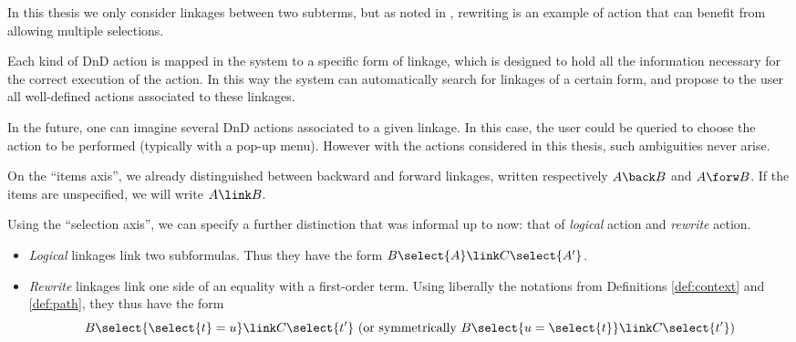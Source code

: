 \begin{remark}
In this thesis we only consider linkages between two subterms, but as noted in
, rewriting is an example of action that can benefit from
allowing multiple selections.
\end{remark}

Each kind of DnD action is mapped in the system to a specific form of linkage,
which is designed to hold all the information necessary for the correct
execution of the action. In this way the system can automatically search for
linkages of a certain form, and propose to the user all well-defined actions
associated to these linkages.

\begin{remark}
  In the future, one can imagine several DnD actions associated to a given
  linkage. In this case, the user could be queried to choose the action to be
  performed (typically with a pop-up menu). However with the actions considered
  in this thesis, such ambiguities never arise.
\end{remark}

On the ``items axis'', we already distinguished between backward and forward
linkages, written respectively $A \back B$ and $A \forw B$. If the items are
unspecified, we will write $A \link B$.

Using the ``selection axis'', we can specify a further distinction that was
informal up to now: that of \emph{logical} action and \emph{rewrite} action.
\begin{itemize}
  \item \emph{Logical} linkages link two subformulas. Thus they have the form
  $B\select{A} \link C\select{A'}$.
  \item \emph{Rewrite} linkages link one side of an equality with a first-order
  term. Using liberally the notations from Definitions \ref{def:context} and
  \ref{def:path}, they thus have the form
  $$B\select{\select{t} = u} \link C
  \select{t'} \text{\ (or symmetrically $B\select{u = \select{t}} \link C
  \select{t'}$)}$$
\end{itemize}


